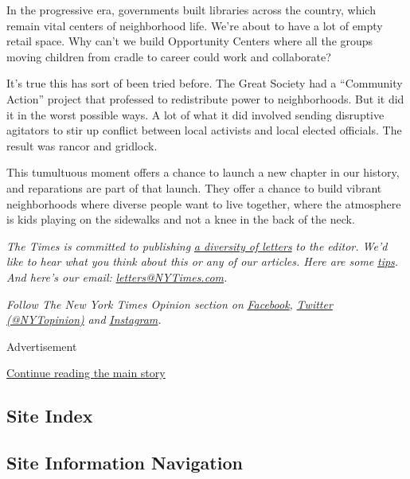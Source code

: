 In the progressive era, governments built libraries across the country,
which remain vital centers of neighborhood life. We're about to have a
lot of empty retail space. Why can't we build Opportunity Centers where
all the groups moving children from cradle to career could work and
collaborate?

It's true this has sort of been tried before. The Great Society had a
``Community Action'' project that professed to redistribute power to
neighborhoods. But it did it in the worst possible ways. A lot of what
it did involved sending disruptive agitators to stir up conflict between
local activists and local elected officials. The result was rancor and
gridlock.

This tumultuous moment offers a chance to launch a new chapter in our
history, and reparations are part of that launch. They offer a chance to
build vibrant neighborhoods where diverse people want to live together,
where the atmosphere is kids playing on the sidewalks and not a knee in
the back of the neck.

\emph{The Times is committed to publishing}
\href{https://www.nytimes3xbfgragh.onion/2019/01/31/opinion/letters/letters-to-editor-new-york-times-women.html}{\emph{a
diversity of letters}} \emph{to the editor. We'd like to hear what you
think about this or any of our articles. Here are some}
\href{https://help.nytimes3xbfgragh.onion/hc/en-us/articles/115014925288-How-to-submit-a-letter-to-the-editor}{\emph{tips}}\emph{.
And here's our email:}
\href{mailto:letters@NYTimes.com}{\emph{letters@NYTimes.com}}\emph{.}

\emph{Follow The New York Times Opinion section on}
\href{https://www.facebookcorewwwi.onion/nytopinion}{\emph{Facebook}}\emph{,}
\href{http://twitter.com/NYTOpinion}{\emph{Twitter (@NYTopinion)}}
\emph{and}
\href{https://www.instagram.com/nytopinion/}{\emph{Instagram}}\emph{.}

Advertisement

\protect\hyperlink{after-bottom}{Continue reading the main story}

\hypertarget{site-index}{%
\subsection{Site Index}\label{site-index}}

\hypertarget{site-information-navigation}{%
\subsection{Site Information
Navigation}\label{site-information-navigation}}


